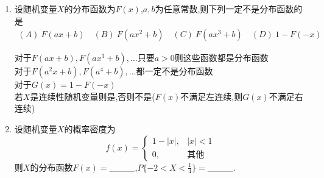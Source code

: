 \documentclass[12pt, a4paper, oneside, UTF8]{ctexbook}
\begin{document}
\begin{enumerate}[label=\arabic*.]
    \item 设随机变量$X$的分布函数为$F(x)$,$a,b$为任意常数,则下列一定不是分布函数的是
    \begin{align*}
        (A)\ F(ax+b) \quad (B)\ F(ax^2+b) \quad (C)\ F(ax^3+b) \quad (D)\ 1-F(-x)
    \end{align*}
    
    \begin{tcolorbox}[title=总结]
        对于$F(ax+b),F(ax^3+b),\ldots$只要$a>0$则这些函数都是分布函数 \\
        对于$F(a^2x+b),F(a^4+b),\ldots$都一定不是分布函数 \\
        对于$G(x)=1-F(-x)$ 
        \\若$X$是连续性随机变量则是,否则不是($F(x)$不满足左连续,则$G(x)$不满足右连续)
    \end{tcolorbox}
    
    \item 设随机变量$X$的概率密度为
    \[
        f(x)=
        \begin{cases}
            1-|x|, & |x|<1 \\
            0, & \text{其他}
        \end{cases}
    \]
    则$X$的分布函数$F(x)=$\_\_\_\_,$P\{-2<X<\frac{1}{4}\}=$\_\_\_\_.
    

\end{enumerate}
\end{document}
